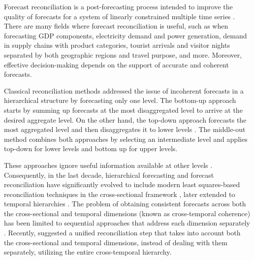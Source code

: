 \documentclass[a4paper,11pt]{article}
\theoremstyle{definition}
\begin{document}
Forecast reconciliation is a post-forecasting process intended to improve the quality of forecasts for a system of linearly constrained multiple time series
\citep{hyndman2011, panagiotelis2021, giro2022}. There are many fields where forecast reconciliation is useful, such as when forecasting GDP components, electricity demand and power generation, demand in supply chains with product categories, tourist arrivals and visitor nights separated by both geographic regions and travel purpose, and more. Moreover, effective decision-making depends on the support of accurate and coherent forecasts.

Classical reconciliation methods addressed the issue of incoherent forecasts in a hierarchical structure by forecasting only one level. The bottom-up approach \citep{dunn1976} starts by summing up forecasts at the most disaggregated level to arrive at the desired aggregate level. On the other hand, the top-down approach \citep{gross1990} forecasts the most aggregated level and then disaggregates it to lower levels \citep{fliedner2001, athanasopoulos2009}. The middle-out method \citep{athanasopoulos2009} combines both approaches by selecting an intermediate level and applies top-down for lower levels and bottom up for upper levels.

These approaches ignore useful information available at other levels \citep{pennings2017}. Consequently, in the last decade, hierarchical forecasting and forecast reconciliation have significantly evolved to include modern least squares-based reconciliation techniques in the cross-sectional framework \citep{hyndman2011, wickramasuriya2019, panagiotelis2021}, later extended to temporal hierarchies \citep{athanasopoulos2017, nystrup2020}. The problem of obtaining consistent forecasts across both the cross-sectional and temporal dimensions (known as cross-temporal coherence) has been limited to sequential approaches that address each dimension separately \citep{kourentzes2019, yagli2019, punia2020, spiliotis2020}. Recently, \citet{difonzo2023} suggested a unified reconciliation step that takes into account both the cross-sectional and temporal dimensions, instead of dealing with them separately, utilizing the entire cross-temporal hierarchy.
\end{document}
